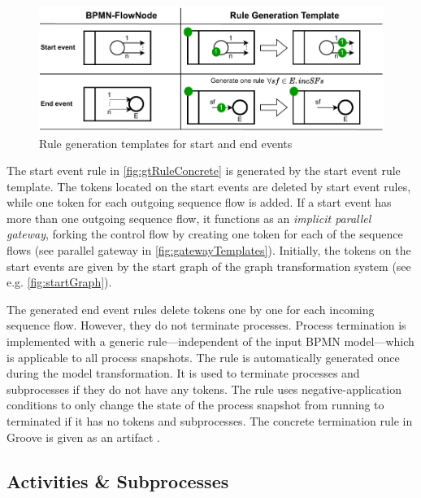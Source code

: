 \documentclass[submission, copyright, creativecommons]{eptcs}
\begin{document}
\begin{figure}[h]
    \centering
    \includegraphics[width=.9\textwidth]{images/start_end_template.pdf}
    \caption{Rule generation templates for start and end events}
    \label{fig:startAndEndTemplate}
\end{figure}

The start event rule in \autoref{fig:gtRuleConcrete} is generated by the start event rule template.
The tokens located on the start events are deleted by start event rules, while one token for each outgoing sequence flow is added.
If a start event has more than one outgoing sequence flow, it functions as an \textit{implicit parallel gateway}, forking the control flow by creating one token for each of the sequence flows (see parallel gateway in \autoref{fig:gatewayTemplates}).
Initially, the tokens on the start events are given by the start graph of the graph transformation system (see e.g. \autoref{fig:startGraph}).
    
The generated end event rules delete tokens one by one for each incoming sequence flow.
However, they do not terminate processes.
Process termination is implemented with a generic rule---independent of the input BPMN model---which is applicable to all process snapshots.
The rule is automatically generated once during the model transformation.
It is used to terminate processes and subprocesses if they do not have any tokens.
The rule uses negative-application conditions to only change the state of the process snapshot from running to terminated if it has no tokens and subprocesses.
The concrete termination rule in Groove is given as an artifact \cite{timkrauterArtifactsTERMGRAPH2022}.

\subsection{Activities \& Subprocesses}
\end{document}
